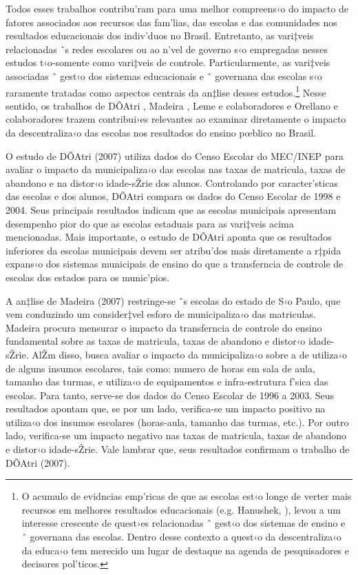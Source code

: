 \documentclass[a4paper, 12pt]{article}
\begin{document}
Todos esses trabalhos contribu’ram para uma melhor compreens‹o do impacto de fatores associados aos recursos das fam’lias, das escolas e das comunidades nos resultados educacionais dos indiv’duos no Brasil. Entretanto, as vari‡veis relacionadas ˆs redes escolares ou ao n’vel de governo s‹o empregadas nesses estudos t‹o-somente como vari‡veis de controle. Particularmente, as vari‡veis associadas ˆ gest‹o dos sistemas educacionais e ˆ governana das escolas s‹o raramente tratadas como aspectos centrais da an‡lise desses estudos.\footnote{O acumulo de evidncias emp’ricas de que as escolas est‹o longe de verter mais recursos em melhores resultados educacionais (e.g. Hanushek, \citeyear{hanushek_interpreting_1995} \citeyear{hanushek_education_1994} ), levou a um interesse crescente de quest›es relacionadas ˆ gest‹o dos sistemas de ensino e ˆ governana das escolas. Dentro desse contexto a quest‹o da descentraliza‹o da educa‹o tem merecido um lugar de destaque na agenda de pesquisadores e decisores pol’ticos.} Nesse sentido, os trabalhos de DÕAtri \citeyear{datri_municipalizacao_2007}, Madeira \citeyear{madeira_effect_2007}, Leme e colaboradores \citeyear{leme_municipalizacao_2009} e Orellano e colaboradores \citeyear{orellano_descentralizacao_2010} trazem contribui›es relevantes ao examinar diretamente o impacto da descentraliza‹o das escolas nos resultados do ensino pœblico no Brasil. 

O estudo de DÕAtri (2007) utiliza dados do Censo Escolar do MEC/INEP para avaliar o impacto da municipaliza‹o das escolas nas taxas de matricula, taxas de abandono e na distor‹o idade-sŽrie dos alunos. Controlando por caracter’sticas das escolas e dos alunos, DÕAtri compara os dados do Censo Escolar de 1998 e 2004. Seus principais resultados indicam que as escolas municipais apresentam desempenho pior do que as escolas estaduais para as vari‡veis acima mencionadas. Mais importante, o estudo de DÕAtri aponta que os resultados inferiores da escolas municipais devem ser atribu’dos mais diretamente a r‡pida expans‹o dos sistemas municipais de ensino do que a transferncia de controle de escolas dos estados para os munic’pios.

A an‡lise de Madeira (2007) restringe-se ˆs escolas do estado de S‹o Paulo, que vem conduzindo um consider‡vel esforo de municipaliza‹o das matriculas. Madeira procura mensurar o impacto da transferncia de controle do ensino fundamental sobre as taxas de matricula, taxas de abandono e distor‹o idade-sŽrie. AlŽm disso, busca avaliar o impacto da municipaliza‹o sobre a de utiliza‹o de alguns insumos escolares, tais como: numero de horas em sala de aula, tamanho das turmas, e utiliza‹o de equipamentos e infra-estrutura f’sica das escolas. Para tanto, serve-se dos dados do Censo Escolar de 1996 a 2003. Seus resultados apontam que, se por um lado, verifica-se um impacto positivo na utiliza‹o dos insumos escolares (horas-aula, tamanho das turmas, etc.). Por outro lado, verifica-se um impacto negativo nas taxas de matricula, taxas de abandono e distor‹o idade-sŽrie. Vale lambrar que, seus resultados confirmam o trabalho de DÕAtri (2007).
\end{document}
